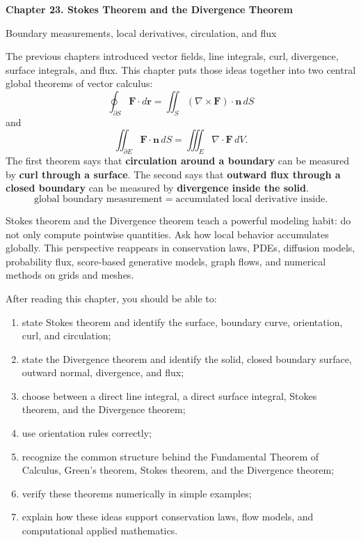 \documentclass[11pt]{article}
\newcommand{\vr}{\mathbf r}
\newcommand{\vn}{\mathbf n}
\newcommand{\vF}{\mathbf F}
\begin{document}
\begin{center}
  {\LARGE\bfseries Chapter 23. Stokes Theorem and the Divergence Theorem\par}
  \vspace{0.3em}
  {\large Boundary measurements, local derivatives, circulation, and flux\par}
\end{center}

\begin{overviewbox}
The previous chapters introduced vector fields, line integrals, curl, divergence, surface integrals, and flux. This chapter puts those ideas together into two central global theorems of vector calculus:
\[
\oint_{\partial S}\vF\cdot d\vr
=
\iint_S(\nabla\times\vF)\cdot\vn\,dS
\]
and
\[
\iint_{\partial E}\vF\cdot\vn\,dS
=
\iiint_E\nabla\cdot\vF\,dV.
\]
The first theorem says that \textbf{circulation around a boundary} can be measured by \textbf{curl through a surface}. The second says that \textbf{outward flux through a closed boundary} can be measured by \textbf{divergence inside the solid}.
\[
\boxed{\text{global boundary measurement}=\text{accumulated local derivative inside}.}
\]
\end{overviewbox}

\begin{bridgebox}
Stokes theorem and the Divergence theorem teach a powerful modeling habit: do not only compute pointwise quantities. Ask how local behavior accumulates globally. This perspective reappears in conservation laws, PDEs, diffusion models, probability flux, score-based generative models, graph flows, and numerical methods on grids and meshes.
\end{bridgebox}

\begin{goalbox}
After reading this chapter, you should be able to:
\begin{enumerate}
  \item state Stokes theorem and identify the surface, boundary curve, orientation, curl, and circulation;
  \item state the Divergence theorem and identify the solid, closed boundary surface, outward normal, divergence, and flux;
  \item choose between a direct line integral, a direct surface integral, Stokes theorem, and the Divergence theorem;
  \item use orientation rules correctly;
  \item recognize the common structure behind the Fundamental Theorem of Calculus, Green's theorem, Stokes theorem, and the Divergence theorem;
  \item verify these theorems numerically in simple examples;
  \item explain how these ideas support conservation laws, flow models, and computational applied mathematics.
\end{enumerate}
\end{goalbox}
\end{document}
